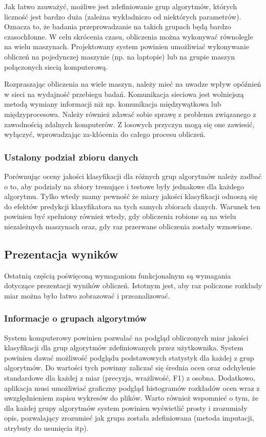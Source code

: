 \documentclass[../thesis.tex]{subfiles}
\begin{document}
Jak łatwo zauważyć, możliwe jest zdefiniowanie grup algorytmów, których liczność jest bardzo duża (zależna wykładniczo od niektórych parametrów). Oznacza to, że badania przeprowadzanie na takich grupach będą bardzo czasochłonne. W celu skrócenia czasu, obliczenia można wykonywać równolegle na wielu maszynach. Projektowany system powinien umożliwiać wykonywanie obliczeń na pojedynczej maszynie (np. na laptopie) lub na grupie maszyn połączonych siecią komputerową.

Rozpraszając obliczenia na wiele maszyn, należy mieć na uwadze wpływ opóźnień w sieci na wydajność przebiegu badań. Komunikacja sieciowa jest wolniejszą metodą wymiany informacji niż np. komunikacja międzywątkowa lub międzyprocesowa. Należy również zdawać sobie sprawę z problemu związanego z zawodnością zdalnych komputerów. Z losowych przyczyn mogą się one zawiesić, wyłączyć, wprowadzając za-kłócenia do całego procesu obliczeń. 

\subsubsection{Ustalony podział zbioru danych}

Porównując oceny jakości klasyfikacji dla różnych grup algorytmów należy zadbać o to, aby podziały na zbiory trenujące i testowe były jednakowe dla każdego algorytmu. Tylko wtedy mamy pewność że miary jakości klasyfikacji odnoszą się do efektów predykcji klasyfikatora na tych samych zbiorach danych. Warunek ten powinien być spełniony również wtedy, gdy obliczenia robione są na wielu niezależnych maszynach oraz, gdy raz przerwane obliczenia zostały wznowione.

\subsection{Prezentacja wyników}

Ostatnią częścią poświęconą wymaganiom funkcjonalnym są wymagania dotyczące prezentacji wyników obliczeń. Istotnym jest, aby raz policzone rozkłady miar można było łatwo zobrazować i przeanalizować.

\subsubsection{Informacje o grupach algorytmów}

System komputerowy powinien pozwalać na podgląd obliczonych miar jakości klasyfikacji dla grup algorytmów zdefiniowanych przez użytkownika. System powinien dawać możliwość podglądu podstawowych statystyk dla każdej z grup algorytmów. Do wartości tych powinny zaliczać się średnia ocen oraz odchylenie standardowe dla każdej z miar (precyzja, wrażliwość, F1) z osobna. Dodatkowo, aplikacja musi umożliwiać graficzny podgląd histogramów rozkładów ocen wraz z uwzględnieniem zapisu wykresów do plików. Warto również wspomnieć o tym, że dla każdej grupy algorytmów system powinien wyświetlić prosty i zrozumiały opis, pozwalający zrozumieć jak grupa została zdefiniowana (metoda imputacji, atrybuty do usunięcia itp).
\end{document}
